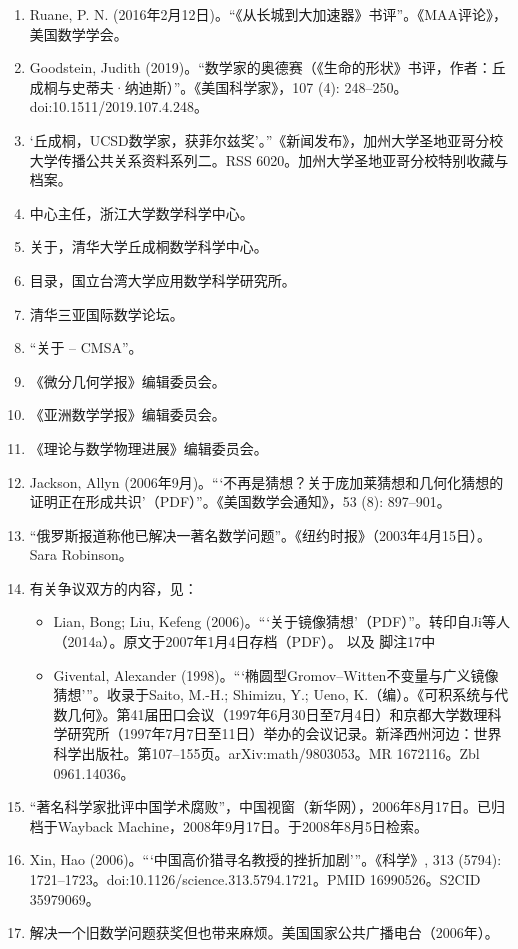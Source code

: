 \begin{enumerate}
\item Ruane, P. N. (2016年2月12日)。“《从长城到大加速器》书评”。《MAA评论》，美国数学学会。  
\item Goodstein, Judith (2019)。“数学家的奥德赛（《生命的形状》书评，作者：丘成桐与史蒂夫·纳迪斯）”。《美国科学家》，107 (4): 248–250。doi:10.1511/2019.107.4.248。
\item ‘丘成桐，UCSD数学家，获菲尔兹奖’。”《新闻发布》，加州大学圣地亚哥分校大学传播公共关系资料系列二。RSS 6020。加州大学圣地亚哥分校特别收藏与档案。  
\item 中心主任，浙江大学数学科学中心。  
\item 关于，清华大学丘成桐数学科学中心。  
\item 目录，国立台湾大学应用数学科学研究所。  
\item 清华三亚国际数学论坛。  
\item “关于 – CMSA”。  
\item 《微分几何学报》编辑委员会。  
\item 《亚洲数学学报》编辑委员会。  
\item 《理论与数学物理进展》编辑委员会。
\item Jackson, Allyn (2006年9月)。“‘不再是猜想？关于庞加莱猜想和几何化猜想的证明正在形成共识’（PDF）”。《美国数学会通知》，53 (8): 897–901。  
\item “俄罗斯报道称他已解决一著名数学问题”。《纽约时报》（2003年4月15日）。Sara Robinson。  
\item 有关争议双方的内容，见：  
\begin{itemize}
\item Lian, Bong; Liu, Kefeng (2006)。“‘关于镜像猜想’（PDF）”。转印自Ji等人（2014a）。原文于2007年1月4日存档（PDF）。  
以及  
脚注17中  
\item Givental, Alexander (1998)。“‘椭圆型Gromov–Witten不变量与广义镜像猜想’”。收录于Saito, M.-H.; Shimizu, Y.; Ueno, K.（编）。《可积系统与代数几何》。第41届田口会议（1997年6月30日至7月4日）和京都大学数理科学研究所（1997年7月7日至11日）举办的会议记录。新泽西州河边：世界科学出版社。第107–155页。arXiv:math/9803053。MR 1672116。Zbl 0961.14036。
\end{itemize}
\item “著名科学家批评中国学术腐败”，中国视窗（新华网），2006年8月17日。已归档于Wayback Machine，2008年9月17日。于2008年8月5日检索。  
\item Xin, Hao (2006)。“‘中国高价猎寻名教授的挫折加剧’”。《科学》, 313 (5794): 1721–1723。doi:10.1126/science.313.5794.1721。PMID 16990526。S2CID 35979069。  
\item 解决一个旧数学问题获奖但也带来麻烦。美国国家公共广播电台（2006年）。  

\end{enumerate}
